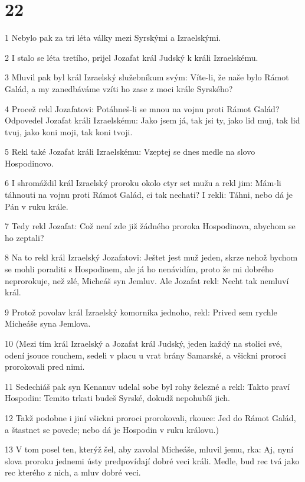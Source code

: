 \chapter{22}

\par 1 Nebylo pak za tri léta války mezi Syrskými a Izraelskými.
\par 2 I stalo se léta tretího, prijel Jozafat král Judský k králi Izraelskému.
\par 3 Mluvil pak byl král Izraelský služebníkum svým: Víte-li, že naše bylo Rámot Galád, a my zanedbáváme vzíti ho zase z moci krále Syrského?
\par 4 Procež rekl Jozafatovi: Potáhneš-li se mnou na vojnu proti Rámot Galád? Odpovedel Jozafat králi Izraelskému: Jako jsem já, tak jsi ty, jako lid muj, tak lid tvuj, jako koni moji, tak koni tvoji.
\par 5 Rekl také Jozafat králi Izraelskému: Vzeptej se dnes medle na slovo Hospodinovo.
\par 6 I shromáždil král Izraelský proroku okolo ctyr set mužu a rekl jim: Mám-li táhnouti na vojnu proti Rámot Galád, ci tak nechati? I rekli: Táhni, nebo dá je Pán v ruku krále.
\par 7 Tedy rekl Jozafat: Což není zde již žádného proroka Hospodinova, abychom se ho zeptali?
\par 8 Na to rekl král Izraelský Jozafatovi: Ještet jest muž jeden, skrze nehož bychom se mohli poraditi s Hospodinem, ale já ho nenávidím, proto že mi dobrého neprorokuje, než zlé, Micheáš syn Jemluv. Ale Jozafat rekl: Necht tak nemluví král.
\par 9 Protož povolav král Izraelský komorníka jednoho, rekl: Prived sem rychle Micheáše syna Jemlova.
\par 10 (Mezi tím král Izraelský a Jozafat král Judský, jeden každý na stolici své, odení jsouce rouchem, sedeli v placu u vrat brány Samarské, a všickni proroci prorokovali pred nimi.
\par 11 Sedechiáš pak syn Kenanuv udelal sobe byl rohy železné a rekl: Takto praví Hospodin: Temito trkati budeš Syrské, dokudž nepohubíš jich.
\par 12 Takž podobne i jiní všickni proroci prorokovali, rkouce: Jed do Rámot Galád, a štastnet se povede; nebo dá je Hospodin v ruku královu.)
\par 13 V tom posel ten, kterýž šel, aby zavolal Micheáše, mluvil jemu, rka: Aj, nyní slova proroku jednemi ústy predpovídají dobré veci králi. Medle, bud rec tvá jako rec kterého z nich, a mluv dobré veci.
